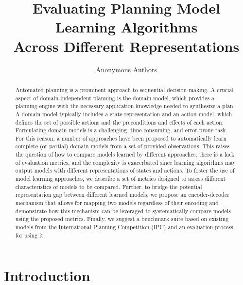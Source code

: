 \documentclass{article}
\title{Evaluating Planning Model Learning Algorithms \\ Across Different Representations}
\author{Anonymous Authors}
\theoremstyle{definition}
\theoremstyle{remark}
\begin{document}
\maketitle

\begin{abstract}
Automated planning is a prominent approach to sequential decision-making. A crucial aspect of domain-independent planning is the domain model, which provides a planning engine with the necessary application knowledge needed to synthesize a plan. A domain model typically includes a state representation and an action model, which defines the set of possible actions and the preconditions and effects of each action. 
Formulating domain models is a challenging, time-consuming, and error-prone task. For this reason, a number of approaches have been proposed to automatically learn complete (or partial) domain models from a set of provided observations. This raises the question of how to compare models learned by different approaches; there is a lack of evaluation metrics, and the complexity is exacerbated since learning algorithms may output models with different representations of states and actions. 
To foster the use of model learning approaches, we describe a set of metrics designed to assess different characteristics of models to be compared. Further, to bridge the potential representation gap between different learned models, we propose an encoder-decoder mechanism that allows for mapping two models regardless of their encoding and demonstrate how this mechanism can be leveraged to systematically compare models using the proposed metrics. Finally, we suggest a benchmark suite based on existing models from the International Planning Competition (IPC) and an evaluation process for using it. 
\end{abstract}

\section{Introduction}
\end{document}
